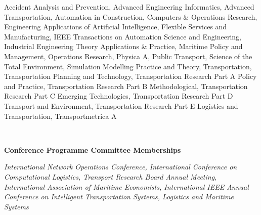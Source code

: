 \documentclass[margin]{res}
\begin{document}
\begin{resume}
\begin{minipage}{\textwidth}
\begin{minipage}{\textwidth}
{Accident Analysis and Prevention, Advanced Engineering Informatics, Advanced Transportation, Automation in Construction, Computers \& Operations Research, Engineering Applications of Artificial Intelligence, Flexible Services and Manufacturing, IEEE Transactions on Automation Science and Engineering, Industrial Engineering Theory Applications \& Practice, Maritime Policy and Management, Operations Research, Physica A, Public Transport, Science of the Total Environment, Simulation Modelling Practice and Theory, Transportation, Transportation Planning and Technology, Transportation Research Part A Policy and Practice, Transportation Research Part B Methodological, Transportation Research Part C Emerging Technologies, Transportation Research Part D Transport and Environment, Transportation Research Part E Logistics and Transportation, Transportmetrica A	}
	\end{minipage}
	\end{minipage}
	\\
	\begin{minipage}{\textwidth}
	{\bf Conference Programme Committee Memberships} \\
	\vspace{0.1in}
	\begin{minipage}{\textwidth}
	\setlength{\leftskip}{0.2in}
	\textit{
International Network Operations Conference, International Conference on Computational Logistics, Transport Research Board Annual Meeting, International Association of Maritime Economists, International IEEE Annual Conference on Intelligent Transportation Systems, Logistics and Maritime Systems	}
	\end{minipage}
	\end{minipage}
	\\

\vspace{-0.15in}

\end{resume}
\end{document}
